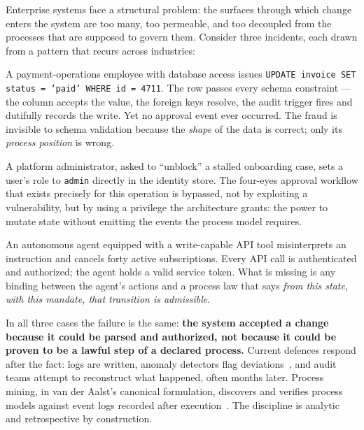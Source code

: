 Enterprise systems face a structural problem: the surfaces through which change
enters the system are too many, too permeable, and too decoupled from the
processes that are supposed to govern them. Consider three incidents, each drawn
from a pattern that recurs across industries:

\begin{description}[leftmargin=1.5em]
  \item[Schema-valid fraud.] A payment-operations employee with database access
        issues \texttt{UPDATE invoice SET status = 'paid' WHERE id = 4711}. The
        row passes every schema constraint --- the column accepts the value, the
        foreign keys resolve, the audit trigger fires and dutifully records the
        write. Yet no approval event ever occurred. The fraud is invisible to
        schema validation because the \emph{shape} of the data is correct; only
        its \emph{process position} is wrong.
  \item[Rogue administrator.] A platform administrator, asked to ``unblock'' a
        stalled onboarding case, sets a user's role to \texttt{admin} directly in
        the identity store. The four-eyes approval workflow that exists precisely
        for this operation is bypassed, not by exploiting a vulnerability, but by
        using a privilege the architecture grants: the power to mutate state
        without emitting the events the process model requires.
  \item[AI-agent mutation.] An autonomous agent equipped with a write-capable
        API tool misinterprets an instruction and cancels forty active
        subscriptions. Every API call is authenticated and authorized; the agent
        holds a valid service token. What is missing is any binding between the
        agent's actions and a process law that says \emph{from this state, with
        this mandate, that transition is admissible}.
\end{description}

In all three cases the failure is the same: \textbf{the system accepted a change
because it could be parsed and authorized, not because it could be proven to be
a lawful step of a declared process.} Current defences respond after the fact:
logs are written, anomaly detectors flag deviations~\cite{ko_comuzzi_anomaly_2021},
and audit teams attempt to reconstruct what happened, often months later.
Process mining, in van der Aalst's canonical formulation, discovers and verifies
process models against event logs recorded after
execution~\cite{van_der_aalst_2016_process_mining}. The discipline is analytic
and retrospective by construction.

